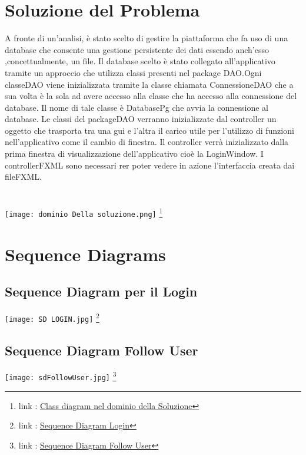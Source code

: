 \documentclass[11pt]{article}
\begin{document}
	\clearpage
	
	\section{Soluzione del Problema}
	A fronte di un’analisi, è stato scelto di gestire la piattaforma che fa uso di una database che consente una gestione persistente dei dati essendo anch'esso ,concettualmente, un file. 
	Il database scelto è stato collegato all'applicativo tramite un approccio che utilizza classi presenti nel package DAO.Ogni classeDAO viene inizializzata tramite la classe chiamata ConnessioneDAO 
	che a sua volta è la sola ad avere accesso alla classe che ha accesso alla connessione del database. Il nome di tale classe è DatabasePg che avvia la connessione al database.
	Le classi del packageDAO verranno inizializzate dal controller un oggetto che trasporta tra una gui e l'altra il carico utile per l'utilizzo di funzioni nell'applicativo come il cambio di finestra.
	Il controller verrà inizializzato dalla prima finestra di visualizzazione dell'applicativo cioè la LoginWindow. I controllerFXML sono necessari rer poter vedere in azione l'interfaccia creata dai fileFXML.
	\\
	\\
	\\
	\texttt{[image: dominio Della soluzione.png]} \footnote{link : \href{https://github.com/torcy-it/PROGETTO-BD-OO}{Class diagram nel dominio della Soluzione}}
	
	\clearpage
	\section{Sequence Diagrams}
	\subsection{Sequence Diagram per il Login}
	\texttt{[image: SD LOGIN.jpg]} \footnote{link : \href{https://github.com/torcy-it/LettoreMusicale/tree/main/DocumentazioneProgetto/SequenceDiagrams}{Sequence Diagram Login}}
	\clearpage
	\subsection{Sequence Diagram Follow User}
	\texttt{[image: sdFollowUser.jpg]} \footnote{link : \href{https://github.com/torcy-it/LettoreMusicale/tree/main/DocumentazioneProgetto/SequenceDiagrams}{Sequence Diagram Follow User}}
	
\end{document}
